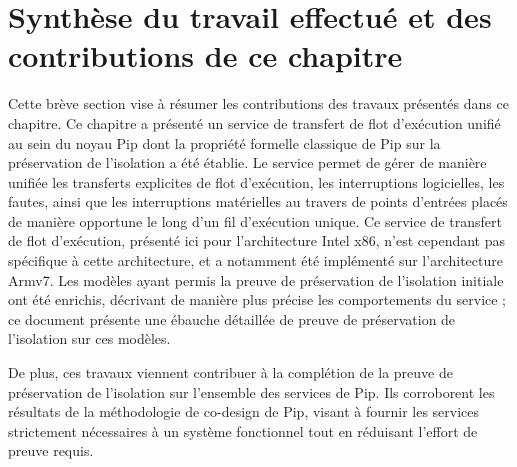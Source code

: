 	\section{Synthèse du travail effectué et des contributions de ce chapitre}

	Cette brève section vise à résumer les contributions des travaux présentés dans ce chapitre. Ce chapitre a présenté un service de transfert de flot d'exécution unifié au sein du noyau Pip dont la propriété formelle classique de Pip sur la préservation de l'isolation a été établie. Le service permet de gérer de manière unifiée les transferts explicites de flot d'exécution, les interruptions logicielles, les fautes, ainsi que les interruptions matérielles au travers de points d'entrées placés de manière opportune le long d'un fil d'exécution unique. Ce service de transfert de flot d'exécution, présenté ici pour l'architecture Intel x86, n'est cependant pas spécifique à cette architecture, et a notamment été implémenté sur l'architecture Armv7.
	Les modèles ayant permis la preuve de préservation de l'isolation initiale ont été enrichis, décrivant de manière plus précise les comportements du service ; ce document présente une ébauche détaillée de preuve de préservation de l'isolation sur ces modèles.

	De plus, ces travaux viennent contribuer à la complétion de la preuve de préservation de l'isolation sur l'ensemble des services de Pip. Ils corroborent les résultats de la méthodologie de co-design de Pip, visant à fournir les services strictement nécessaires à un système fonctionnel tout en réduisant l'effort de preuve requis.
